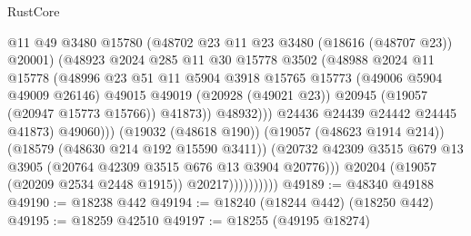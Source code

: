 \begin{lexlean}{RustCore}
\begin{coremodule}
                                      @11
                                      @49
                                      @3480
                                      @15780
                                      (@48702 @23 @11 @23 @3480 (@18616 (@48707 @23)) @20001)
                                      (@48923
                                        @2024
                                        @285
                                        @11
                                        @30
                                        @15778
                                        @3502
                                        (@48988
                                          @2024
                                          @11
                                          @15778
                                          (@48996
                                            @23
                                            @51
                                            @11
                                            @5904
                                            @3918
                                            @15765
                                            @15773
                                            (@49006 @5904 @49009 @26146)
                                            @49015
                                            @49019
                                            (@20928 (@49021 @23))
                                            @20945
                                            (@19057 (@20947 @15773 @15766))
                                            @41873))
                                        @48932)))
                                  @24436
                                  @24439
                                  @24442
                                  @24445
                                  @41873)
                                @49060)))
                          (@19032 (@48618 @190))
                          (@19057 (@48623 @1914 @214))
                          (@18579 (@48630 @214 @192 @15590 @3411))
                          (@20732
                            @42309
                            @3515
                            @679
                            @13
                            @3905
                            (@20764 @42309 @3515 @676 @13 @3904 @20776)))
                        @20204
                        (@19057 (@20209 @2534 @2448 @1915))
                        @20217))))))))))
@49189 := @48340 @49188
@49190 := @18238 @442
@49194 := @18240 (@18244 @442) (@18250 @442)
@49195 := @18259 @42510
@49197 := @18255 (@49195 @18274)

\end{coremodule}
\end{lexlean}
